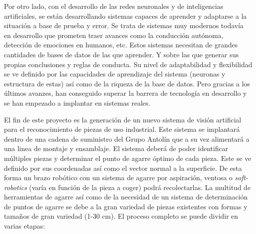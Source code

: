 Por otro lado, con el desarrollo de las redes neuronales y de inteligencias artificiales, se están desarrollando sistemas capaces de aprender y adaptarse a la situación a base de prueba y error. Se trata de sistemas muy modernos todavía en desarrollo que prometen traer avances como la conducción autónoma, detección de emociones en humanos, etc. Estos sistemas necesitan de grandes cantidades de bases de datos de las que aprender. Y sobre las que generar sus propias conclusiones y reglas de conducta. Su nivel de adaptabilidad y flexibilidad se ve definido por las capacidades de aprendizaje del sistema (neuronas y estructura de estas) así como de la riqueza de la base de datos. Pero gracias a los últimos avanzes, han conseguido superar la barrera de tecnología en desarrollo y se han empezado a implantar en sistemas reales.

El fin de este proyecto es la generación de un nuevo sistema de visión artificial para el reconocimiento de piezas de uso industrial. Este sistema se implantará dentro de una cadena de suministro del Grupo Antolín\textsuperscript{\textregistered} que a su vez alimentará a una linea de montaje y ensamblaje. El sistema deberá de poder identificar múltiples piezas y determinar el punto de agarre óptimo de cada pieza. Este se ve definido por sus coordenadas así como el vector normal a la superficie. De esta forma un brazo robótico con un sistema de agarre por aspiración, ventosa o \textit{soft-robotics} (varía en función de la pieza a coger) podrá recolectarlas. La multitud de herramientas de agarre así como de la necesidad de un sistema de determinación de puntos de agarre se debe a la gran variedad de piezas existentes con formas y tamaños de gran variedad (1-30 cm). El proceso completo se puede dividir en varias etapas:


